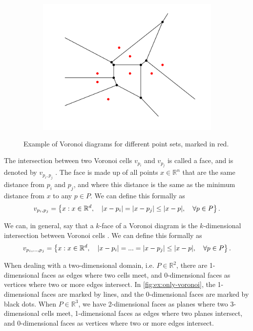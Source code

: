 \begin{figure}[ht]
\begin{subfigure}[b]{0.3\textwidth}
        \includegraphics[width=\textwidth]{report/Images/Theory/voronoi/voronoi_example3.png}
    \end{subfigure}
    \caption[Example of Voronoi diagrams]{Example of Voronoi diagrams for different point sets, marked in red.}
    \label{fig:ex:only-voronoi}
\end{figure}

The intersection between two Voronoi cells $v_{p_i}$ and $v_{p_j}$ is called a face, and is denoted by $v_{p_i, p_j}$ \cite{UPR_chapter}. The face is made up of all points $x \in \mathbb{R}^n$ that are the same distance from $p_i$ and $p_j$, and where this distance is the same as the minimum distance from $x$ to any $p \in P$. We can define this formally as
\begin{equation}
    v_{p_i, p_j} = \left\{ x : x \in \mathbb{R}^d,\quad \lvert x - p_i\rvert = \lvert x - p_j\rvert \leq \lvert x - p\rvert,\quad \forall p \in P \right\}.
\end{equation}

We can, in general, say that a $k$-face of a Voronoi diagram is the $k$-dimensional intersection between Voronoi cells \cite{UPR_chapter}. We can define this formally as
\begin{equation}
\label{eq:voronoi-k-faces}
    v_{p_i,..., p_j} = \left\{ x : x \in \mathbb{R}^d,\quad \lvert x - p_i\rvert = ... = \lvert x - p_j\rvert \leq \lvert x - p\rvert,\quad \forall p \in P \right\}.
\end{equation}

When dealing with a two-dimensional domain, i.e. $P \in \mathbb{R}^2$, there are 1-dimensional faces as edges where two cells meet, and 0-dimensional faces as vertices where two or more edges intersect. In \autoref{fig:ex:only-voronoi}, the 1-dimensional faces are marked by lines, and the 0-dimensional faces are marked by black dots. When $P \in \mathbb{R}^3$, we have 2-dimensional faces as planes where two 3-dimensional cells meet, 1-dimensional faces as edges where two planes intersect, and 0-dimensional faces as vertices where two or more edges intersect.

